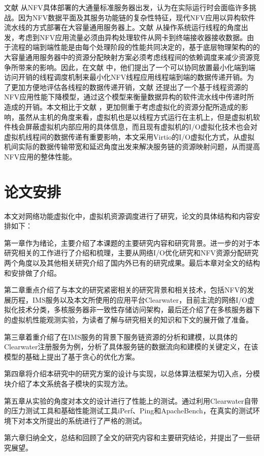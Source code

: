 文献  从NFV具体部署的大通量标准服务器出发，认为在实际运行时会面临许多挑战。因为NFV数据平面及其服务功能链的复杂性特征，现代NFV应用以异构软件流水线的方式部署在大容量通用服务器上。文献  从操作系统运行线程的角度出发，考虑到NFV应用流量必须由异构处理软件从网卡到终端接收器接收数据。由于流程的端到端性能是由每个处理阶段的性能共同决定的，基于底层物理架构的的大容量通用服务器中的资源分配映射方案必须考虑线程间的依赖调度来减少资源竞争所带来的影响。因此，在文献  中，他们提出了一个可以协同放置最小化端到端访问开销的线程调度机制来最小化NFV线程应用线程端到端的数据传递开销。为了更加方便地评估各线程的数据传递开销，文献  还提出了一个基于线程资源的NFV应用性能下降模型，通过这个模型来衡量数据异构的软件流水线中传递时所造成的开销。本文相比于文献 ，更加侧重于考虑虚拟化的资源分配所造成的影响，虽然从主机的角度来看，虚拟机也是以线程方式运行在主机上，但是虚拟机软件栈会屏蔽虚拟机内部应用的具体信息，而且现有虚拟机的I/O虚拟化技术也会对虚拟机线程间的数据传递有重要影响，本文采用Virtio的I/O虚拟化方式，从虚拟机间实际的数据传输带宽和延迟角度出发来解决服务链的资源映射问题，从而提高NFV应用的整体性能。

\section{论文安排}
本文对网络功能虚拟化中，虚拟机资源调度进行了研究，论文的具体结构和内容安排如下：

第一章作为绪论，主要介绍了本课题的主要研究内容和研究背景。进一步的对于本研究相关的工作进行了介绍和梳理，主要从网络I/O优化研究和NFV资源分配研究两个角度以及其他相关研究介绍了国内外已有的研究成果。最后本章对全文的结构和安排做了介绍。

第二章重点介绍了与本文的研究紧密相关的研究背景和相关技术，包括NFV的发展历程，IMS服务以及本文所使用的应用平台Clearwater，目前主流的网络I/O虚拟化技术分类，多核服务器非一致性存储访问架构，最后还介绍了在多核服务器下的虚拟机性能观测实验，为读者了解与研究相关的知识和下文的展开做了准备。

第三章着重介绍了在IMS服务的背景下服务链资源的分析和建模，以具体的Clearwater注册服务为例，分析了具体服务链的数据流向和建模的关键定义，在该模型的基础上提出了基于贪心的优化方案。

第四章将介绍本研究中的研究方案的设计与实现，以总体算法框架为切入点，分模块介绍了本文系统各子模块的实现方法。

第五章从实验的角度对本文的设计进行了性能上的测试。通过利用Clearwater自带的压力测试工具和基础性能测试工具iPerf、Ping和ApacheBench，在真实的测试环境下对本文所提出的系统进行了严格的测试。

第六章归纳全文，总结和回顾了全文的研究内容和主要研究结论，并提出了一些研究展望。

